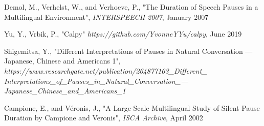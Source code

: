\begin{thebibliography}{100}
     Demol, M., Verhelst, W., and Verhoeve, P.,     
    			"The Duration of Speech Pauses in a Multilingual Environment",
			\emph{INTERSPEECH 2007}, 
			January 2007

    
     Yu, Y., Vrbik, P., 
    			"Calpy" 
			\emph{https://github.com/YvonneYYu/calpy}, June 2019

     Shigemitsa, Y., 
    			"Different Interpretations of Pauses in Natural Conversation ---Japanese, Chinese and Americans 1",
			\emph{https://www.researchgate.net/publication/264877163\_Different\_ \\ 
			Interpretations\_of\_Pauses\_in\_Natural\_Conversation\_---Japanese\_Chinese\_and\_Americans\_1}

     Campione, E., and Véronis, J., 
    			"A Large-Scale Multilingual Study of Silent Pause Duration by Campione and Veronis",
			\emph{ISCA Archive}, April 2002
    

 
\end{thebibliography}


